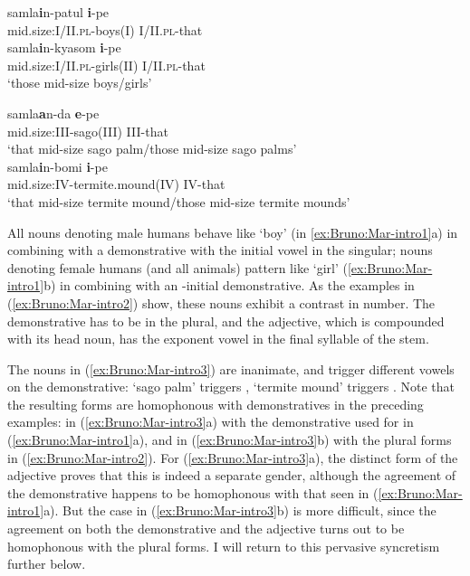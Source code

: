 \documentclass[output=collectionpaper]{langsci/langscibook}
\begin{document}
\ea\label{ex:Bruno:Mar-intro2}
\begin{xlist}
\ex
\gll samla\GH\textbf{i}n-patul \textbf{i}-pe\\
mid.size:I/II.\textsc{pl}-boys(I) I/II.\textsc{pl}-that\\
\ex
\gll samla\GH\textbf{i}n-kyasom \textbf{i}-pe\\
mid.size:I/II.\textsc{pl}-girls(II) I/II.\textsc{pl}-that\\
\glt `those mid-size boys/girls'
\end{xlist}
\z

\ea\label{ex:Bruno:Mar-intro3}
\begin{xlist}
\ex
\gll samla\GH\textbf{a}n-da \textbf{e}-pe\\
mid.size:III-sago(III) III-that\\
\glt `that mid-size sago palm/those mid-size sago palms'\\
\ex
\gll samla\GH\textbf{i}n-bomi \textbf{i}-pe\\
mid.size:IV-termite.mound(IV) IV-that\\
\glt `that mid-size termite mound/those mid-size termite mounds'\\
\end{xlist}
\z

\noindent All nouns denoting male humans behave like  `boy' (in \ref{ex:Bruno:Mar-intro1}a) in combining with a demonstrative with the initial vowel  in the singular; nouns denoting female humans (and all animals) pattern like  `girl' (\ref{ex:Bruno:Mar-intro1}b) in combining with an -initial demonstrative. As the examples in (\ref{ex:Bruno:Mar-intro2}) show, these nouns exhibit a contrast in number. The demonstrative has to be  in the plural, and the adjective, which is compounded with its head noun, has the exponent vowel  in the final syllable of the stem.

The nouns in (\ref{ex:Bruno:Mar-intro3}) are inanimate, and trigger different vowels on the demonstrative:  `sago palm' triggers ,  `termite mound' triggers . Note that the resulting forms are homophonous with demonstratives in the preceding examples:  in (\ref{ex:Bruno:Mar-intro3}a) with the demonstrative used for  in (\ref{ex:Bruno:Mar-intro1}a), and  in (\ref{ex:Bruno:Mar-intro3}b) with the plural forms in (\ref{ex:Bruno:Mar-intro2}).  For (\ref{ex:Bruno:Mar-intro3}a), the distinct form  of the adjective proves that this is indeed a separate gender, although the agreement of the demonstrative happens to be homophonous with that seen in (\ref{ex:Bruno:Mar-intro1}a). But the case in (\ref{ex:Bruno:Mar-intro3}b) is more difficult, since the agreement on both the demonstrative and the adjective turns out to be homophonous with the plural forms. I will return to this pervasive syncretism further below.
\end{document}

